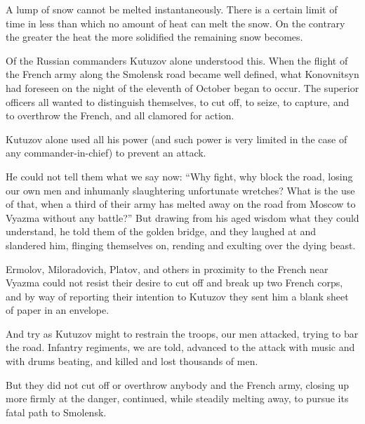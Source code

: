 A lump of snow cannot be melted instantaneously. There is a
certain limit of time in less than which no amount of heat can
melt the snow. On the contrary the greater the heat the more
solidified the remaining snow becomes.

Of the Russian commanders Kutuzov alone understood this. When the
flight of the French army along the Smolensk road became well
defined, what Konovnitsyn had foreseen on the night of the
eleventh of October began to occur. The superior officers all
wanted to distinguish themselves, to cut off, to seize, to
capture, and to overthrow the French, and all clamored for
action.

Kutuzov alone used all his power (and such power is very limited
in the case of any commander-in-chief) to prevent an attack.

He could not tell them what we say now: ``Why fight, why block
the road, losing our own men and inhumanly slaughtering
unfortunate wretches? What is the use of that, when a third of
their army has melted away on the road from Moscow to Vyazma
without any battle?'' But drawing from his aged wisdom what they
could understand, he told them of the golden bridge, and they
laughed at and slandered him, flinging themselves on, rending and
exulting over the dying beast.

Ermolov, Miloradovich, Platov, and others in proximity to the
French near Vyazma could not resist their desire to cut off and
break up two French corps, and by way of reporting their
intention to Kutuzov they sent him a blank sheet of paper in an
envelope.

And try as Kutuzov might to restrain the troops, our men
attacked, trying to bar the road. Infantry regiments, we are
told, advanced to the attack with music and with drums beating,
and killed and lost thousands of men.

But they did not cut off or overthrow anybody and the French
army, closing up more firmly at the danger, continued, while
steadily melting away, to pursue its fatal path to Smolensk.